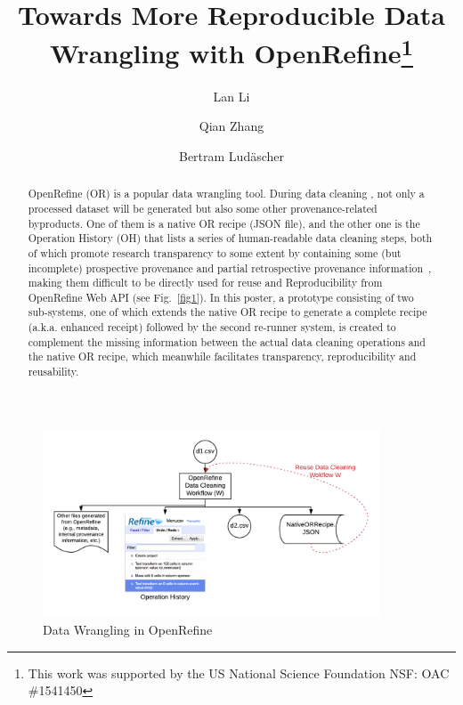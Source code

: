 \documentclass[runningheads]{llncs}
\begin{document}
\newcommand{\ywa}[1]{\textsf{#1}}

%
\title{Towards More Reproducible Data Wrangling with OpenRefine\thanks{This work was supported by the US National Science Foundation NSF: OAC \#1541450}}
%
%
\author{Lan Li \and
Qian Zhang \and
Bertram Ludäscher}
%
%

\maketitle              %
%
\begin{abstract}
OpenRefine (OR) is a popular data wrangling tool. During data cleaning , not only a processed dataset will be generated but also some other provenance-related byproducts. One of them is a native OR recipe (JSON file), and the other one is the Operation History (OH) that lists a series of human-readable data cleaning steps, both of which promote research transparency to some extent by containing some (but incomplete) prospective provenance and partial retrospective provenance information~\cite{ref_proc1}, making them difficult to be directly used for reuse and Reproducibility from OpenRefine Web API (see Fig.~\ref{fig1}). In this poster, a prototype consisting of two sub-systems, one of which extends the native OR recipe to generate a complete recipe (a.k.a. enhanced receipt)  followed by the second re-runner system, is created to complement the missing information between the actual data cleaning operations and the native OR recipe, which meanwhile facilitates transparency, reproducibility and reusability. 

\end{abstract}

\begin{figure}
\centering
\includegraphics[width=100mm,scale=0.7]{figs/DC.png}
\caption{Data Wrangling in OpenRefine} \label{fig1}
\end{figure}
\end{document}
